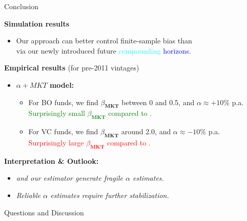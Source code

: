 \documentclass[aspectratio=169,11pt]{beamer}
\begin{document}
\begin{frame}{Conclusion}


\textbf{Simulation results}
\begin{itemize}
 	 \item Our approach can better control finite-sample bias than \cite{DLP12} \\ via our newly introduced future \textcolor{cyan}{compounding} \textcolor{blue}{horizons}.
\end{itemize}

\vspace{1em}

\textbf{Empirical results} (for pre-2011 vintages)
\begin{itemize}
	\item \textbf{$\alpha+MKT$ model:}
	\begin{itemize}
		\item For BO funds, we find $\beta_{\textbf{MKT}}$ between 0 and 0.5, and  $\alpha \approx +10\%$ p.a. \\
		\textcolor{green}{Surprisingly small $\beta_{\textbf{MKT}}$ compared to \cite{D79}.}
		\item For VC funds, we find $\beta_{\textbf{MKT}}$ around 2.0, and $\alpha \approx -10\%$ p.a.\\ 
		\textcolor{red}{Surprisingly large $\beta_{\textbf{MKT}}$ compared to \cite{D79}.}
	\end{itemize}
\end{itemize}

\vspace{1em}

\textbf{Interpretation \& Outlook:} 
\begin{itemize}
 \item \emph{\cite{DLP12} and our estimator generate fragile $\alpha$ estimates.}
 \item \emph{Reliable $\alpha$ estimates require further stabilization.}
\end{itemize}


\vspace{1em}

\centering
\Large Questions and Discussion
\end{frame}
\end{document}

